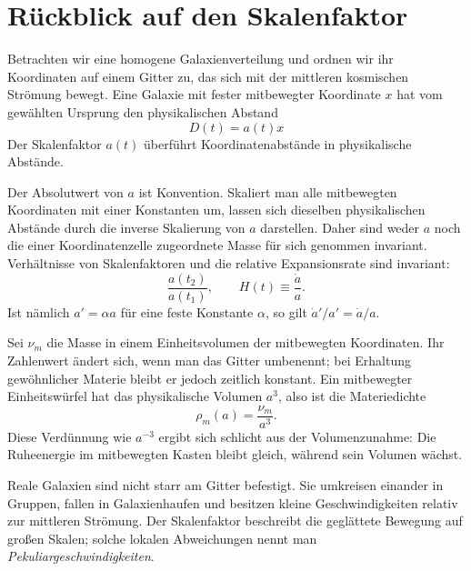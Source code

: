 \section{Rückblick auf den Skalenfaktor}

Betrachten wir eine homogene Galaxienverteilung und ordnen wir ihr Koordinaten auf einem Gitter zu, das sich mit der mittleren kosmischen Strömung bewegt. Eine Galaxie mit fester mitbewegter Koordinate \(x\) hat vom gewählten Ursprung den physikalischen Abstand
\begin{equation}
D(t)=a(t)x
\label{eq:c02-distance}
\end{equation}
Der Skalenfaktor \(a(t)\) überführt Koordinatenabstände in physikalische Abstände.

Der Absolutwert von \(a\) ist Konvention. Skaliert man alle mitbewegten Koordinaten mit einer Konstanten um, lassen sich dieselben physikalischen Abstände durch die inverse Skalierung von \(a\) darstellen. Daher sind weder \(a\) noch die einer Koordinatenzelle zugeordnete Masse für sich genommen invariant. Verhältnisse von Skalenfaktoren und die relative Expansionsrate sind invariant:
\begin{equation}
\frac{a(t_2)}{a(t_1)},
\qquad
H(t)\equiv\frac{\dot a}{a}.
\label{eq:c02-hubble}
\end{equation}
Ist nämlich \(a'=\alpha a\) für eine feste Konstante \(\alpha\), so gilt \(\dot a'/a'=\dot a/a\).

Sei \(\nu_m\) die Masse in einem Einheitsvolumen der mitbewegten Koordinaten. Ihr Zahlenwert ändert sich, wenn man das Gitter umbenennt; bei Erhaltung gewöhnlicher Materie bleibt er jedoch zeitlich konstant. Ein mitbewegter Einheitswürfel hat das physikalische Volumen \(a^3\), also ist die Materiedichte
\begin{equation}
\boxed{\rho_m(a)=\frac{\nu_m}{a^3}.}
\label{eq:c02-matter-density}
\end{equation}
Diese Verdünnung wie \(a^{-3}\) ergibt sich schlicht aus der Volumenzunahme: Die Ruheenergie im mitbewegten Kasten bleibt gleich, während sein Volumen wächst.

Reale Galaxien sind nicht starr am Gitter befestigt. Sie umkreisen einander in Gruppen, fallen in Galaxienhaufen und besitzen kleine Geschwindigkeiten relativ zur mittleren Strömung. Der Skalenfaktor beschreibt die geglättete Bewegung auf großen Skalen; solche lokalen Abweichungen nennt man \emph{Pekuliargeschwindigkeiten}.

\begin{classroomqa}
\end{classroomqa}


